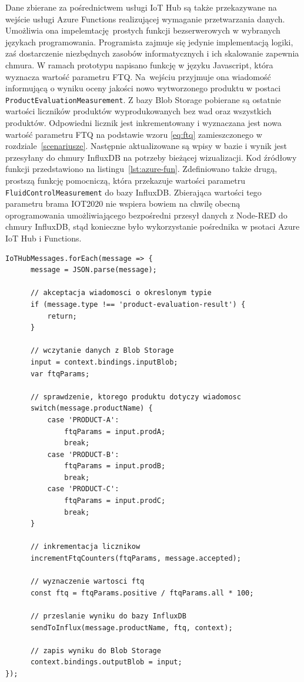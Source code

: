 \documentclass[a4paper, 12pt, twoside]{article}
\begin{document}
Dane zbierane za pośrednictwem usługi IoT Hub są także przekazywane na
wejście usługi Azure Functions realizującej wymaganie przetwarzania danych.
Umożliwia ona impelemtację prostych funkcji bezserwerowych w wybranych językach programowania.
Programista zajmuje się jedynie implementacją logiki, zaś dostarczenie niezbędnych
zasobów informatycznych i ich skalowanie zapewnia chmura.
W ramach prototypu napisano funkcję w języku Javascript, która wyznacza
wartość parametru FTQ. Na~wejściu przyjmuje ona wiadomość informującą o wyniku
oceny jakości nowo wytworzonego produktu w postaci \texttt{ProductEvaluationMeasurement}.
Z bazy Blob Storage pobierane są ostatnie wartości liczników produktów wyprodukowanych
bez wad oraz wszystkich produktów. Odpowiedni licznik jest inkrementowany
i wyznaczana jest nowa wartość parametru FTQ na podstawie wzoru \ref{eq:ftq}
zamieszczonego w rozdziale~\ref{scenariusze}. Następnie aktualizowane są wpisy
w bazie i wynik jest przesyłany do chmury InfluxDB na potrzeby bieżącej wizualizacji.
Kod źródłowy funkcji przedstawiono na listingu~\ref{lst:azure-fun}. Zdefiniowano
także drugą, prostszą funkcję pomocniczą, która przekazuje wartości parametru \texttt{FluidControlMeasurement}
do bazy InfluxDB. Zbierająca wartości tego parametru brama IOT2020
nie wspiera bowiem na chwilę obecną oprogramowania
umożliwiającego bezpośredni przesył danych z Node-RED do chmury InfluxDB, stąd
konieczne było wykorzystanie pośrednika w psotaci Azure IoT Hub i Functions.

\begin{lstlisting}[caption={Kod źródłowy funkcji wyznaczającej aktualną wartość 
      parametru FTQ osadzonej w usłudze Azure Functions}, label={lst:azure-fun}]
IoTHubMessages.forEach(message => {
      message = JSON.parse(message);
 
      // akceptacja wiadomosci o okreslonym typie
      if (message.type !== 'product-evaluation-result') {
          return;
      }
  
      // wczytanie danych z Blob Storage
      input = context.bindings.inputBlob;
      var ftqParams;

      // sprawdzenie, ktorego produktu dotyczy wiadomosc
      switch(message.productName) {
          case 'PRODUCT-A':
              ftqParams = input.prodA;
              break;
          case 'PRODUCT-B':
              ftqParams = input.prodB;
              break;
          case 'PRODUCT-C':
              ftqParams = input.prodC;
              break;
      }

      // inkrementacja licznikow
      incrementFtqCounters(ftqParams, message.accepted);

      // wyznaczenie wartosci ftq
      const ftq = ftqParams.positive / ftqParams.all * 100;

      // przeslanie wyniku do bazy InfluxDB
      sendToInflux(message.productName, ftq, context);

      // zapis wyniku do Blob Storage
      context.bindings.outputBlob = input;
});   
\end{lstlisting}
\end{document}
